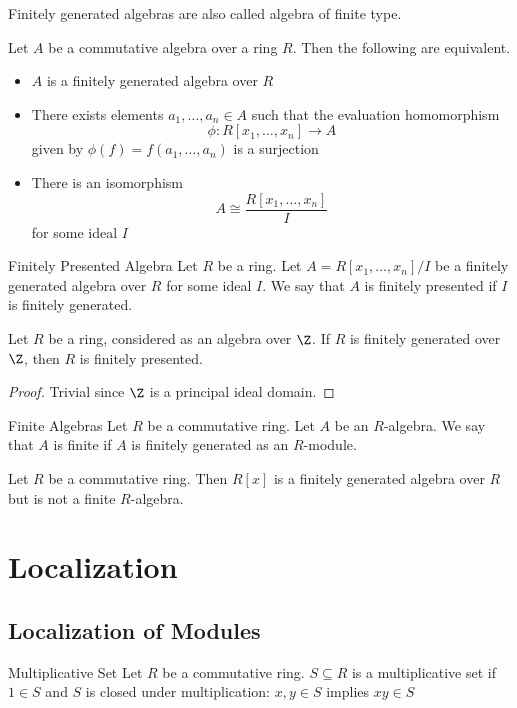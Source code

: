 \documentclass[a4paper]{article}
\begin{document}
Finitely generated algebras are also called algebra of finite type. 

\begin{thm}{}{} Let $A$ be a commutative algebra over a ring $R$. Then the following are equivalent. 
\begin{itemize}
\item $A$ is a finitely generated algebra over $R$
\item There exists elements $a_1,\dots,a_n\in A$ such that the evaluation homomorphism $$\phi:R[x_1,\dots,x_n]\to A$$ given by $\phi(f)=f(a_1,\dots,a_n)$ is a surjection
\item There is an isomorphism $$A\cong\frac{R[x_1,\dots,x_n]}{I}$$ for some ideal $I$
\end{itemize}
\end{thm}

\begin{defn}{Finitely Presented Algebra}{} Let $R$ be a ring. Let $A=R[x_1,\dots,x_n]/I$ be a finitely generated algebra over $R$ for some ideal $I$. We say that $A$ is finitely presented if $I$ is finitely generated. 
\end{defn}

\begin{lmm}{}{} Let $R$ be a ring, considered as an algebra over $\Z$. If $R$ is finitely generated over $\Z$, then $R$ is finitely presented. \tcbline
\begin{proof}
Trivial since $\Z$ is a principal ideal domain. 
\end{proof}
\end{lmm}

\begin{defn}{Finite Algebras}{} Let $R$ be a commutative ring. Let $A$ be an $R$-algebra. We say that $A$ is finite if $A$ is finitely generated as an $R$-module. 
\end{defn}

\begin{eg}{}{} Let $R$ be a commutative ring. Then $R[x]$ is a finitely generated algebra over $R$ but is not a finite $R$-algebra. 
\end{eg}

\pagebreak
\section{Localization}
\subsection{Localization of Modules}
\begin{defn}{Multiplicative Set}{} Let $R$ be a commutative ring. $S\subseteq R$ is a multiplicative set if $1\in S$ and $S$ is closed under multiplication: $x,y\in S$ implies $xy\in S$
\end{defn}
\end{document}
